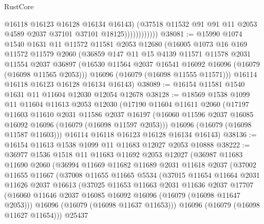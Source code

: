 \begin{lexlean}{RustCore}
\begin{coremodule}
                            @16118
                            @16123
                            @16128
                            @16134
                            @16143)
                          (@37518
                            @11532
                            @91
                            @91
                            @11
                            @2053
                            @4589
                            @2037
                            @37101
                            @37101
                            @18125))))))))))))
@38081 := @15990
    @1074
    @1540
    @1631
    @11
    @11572
    @11581
    @2053
    @12680
    (@16005
      @1073
      @16
      @169
      @11572
      @11579
      @2060
      (@36859
        @147
        @11
        @15
        @4139
        @11571
        @11578
        @2031
        @11554
        @2037
        @36897
        (@16530 @11564 @2037 @16541 @16092 @16096 (@16079 (@16098 @11565 @2053)))
        @16096
        (@16079 (@16098 @11555 @11571)))
      @16114
      @16118
      @16123
      @16128
      @16134
      @16143)
@38089 := @16154 @11581 @1540 @1631 @11 @11604 @12030 @12054 @12678
@38128 := @18569
    @1538
    @1099
    @11
    @11604
    @11613
    @2053
    @12030
    (@17190
      @11604
      @11611
      @2060
      (@17197
        @11603
        @11610
        @2031
        @11586
        @2037
        @16197
        (@16060 @11596 @2037 @16085 @16092 @16096 (@16079 (@16098 @11597 @2053)))
        @16096
        (@16079 (@16098 @11587 @11603)))
      @16114
      @16118
      @16123
      @16128
      @16134
      @16143)
@38136 := @16154 @11613 @1538 @1099 @11 @11683 @12027 @2053 @10888
@38222 := @36977
    @1536
    @1518
    @11
    @11683
    @11692
    @2053
    @12027
    (@36987
      @11683
      @11690
      @2060
      (@36994
        @11669
        @11682
        @11689
        @2031
        @11618
        @2037
        (@37002
          @11655
          @11667
          (@37008
            @11655
            @11665
            @5534
            (@37015
              @11654
              @11664
              @2031
              @11626
              @2037
              @16613
              (@37025
                @11653
                @11663
                @2031
                @11636
                @2037
                @17707
                (@16060 @11646 @2037 @16085 @16092 @16096 (@16079 (@16098 @11647 @2053)))
                @16096
                (@16079 (@16098 @11637 @11653)))
              @16096
              (@16079 (@16098 @11627 @11654)))
            @25437

\end{coremodule}
\end{lexlean}
